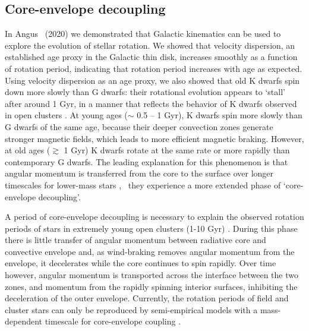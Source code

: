 \subsection{Core-envelope decoupling}

In Angus \etal\ (2020) we demonstrated that Galactic kinematics can be used to
explore the evolution of stellar rotation.
We showed that velocity dispersion, an established age proxy in the Galactic
thin disk, increases smoothly as a function of rotation period, indicating
that rotation period increases with age as expected.
Using velocity dispersion as an age proxy, we also showed that old K dwarfs
spin down more slowly than G dwarfs: their rotational evolution appears to
`stall' after around 1 Gyr, in a manner that reflects the behavior of K dwarfs
observed in open clusters \citep{curtis2019}.
At young ages ($\sim$ 0.5 -- 1 Gyr), K dwarfs spin more slowly than G dwarfs of
the same age, because their deeper convection zones generate stronger magnetic
fields, which leads to more efficient magnetic braking.
However, at old ages ($\gtrsim$ 1 Gyr) K dwarfs rotate at the same rate or
more rapidly than contemporary G dwarfs.
The leading explanation for this phenomenon is that angular momentum is
transferred from the core to the surface over longer timescales for lower-mass
stars \citep{spada2019}, \ie\ they experience a more extended phase of
`core-envelope decoupling'.

A period of core-envelope decoupling is necessary to explain the observed
rotation periods of stars in extremely young open clusters (1-10 Gyr)
\citep[\eg][]{irwin2007, bouvier2008, denissenkov2010, spada2011, reiners2012,
gallet2013}.
During this phase there is little transfer of angular momentum between
radiative core and convective envelope and, as wind-braking removes angular
momentum from the envelope, it decelerates while the core continues to spin
rapidly.
Over time however, angular momentum is transported across the interface
between the two zones, and momentum from the rapidly spinning interior
surfaces, inhibiting the deceleration of the outer envelope.
Currently, the rotation periods of field and cluster stars can only be
reproduced by semi-empirical models with a mass-dependent timescale for
core-envelope coupling \citep[][Angus \etal, 2020]{spada2019, curtis2019}.



